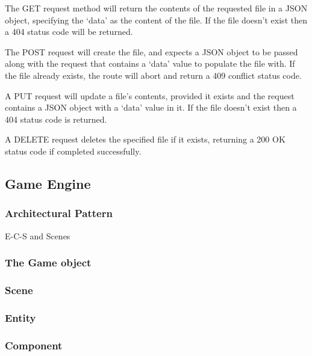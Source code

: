 	The GET request method will return the contents of the requested file in a JSON object, specifying the `data' as the content of the file. If the file doesn't exist then a 404 status code will be returned.

	The POST request will create the file, and expects a JSON object to be passed along with the request that contains a `data' value to populate the file with. If the file already exists, the route will abort and return a 409 conflict status code.

	A PUT request will update a file's contents, provided it exists and the request contains a JSON object with a `data' value in it. If the file doesn't exist then a 404 status code is returned.

	A DELETE request deletes the specified file if it exists, returning a 200 OK status code if completed successfully.

	\subsection{Game Engine}
	\subsubsection{Architectural Pattern}
	E-C-S and Scenes
	\subsubsection{The Game object}
	\subsubsection{Scene}
	\subsubsection{Entity}
	\subsubsection{Component}
